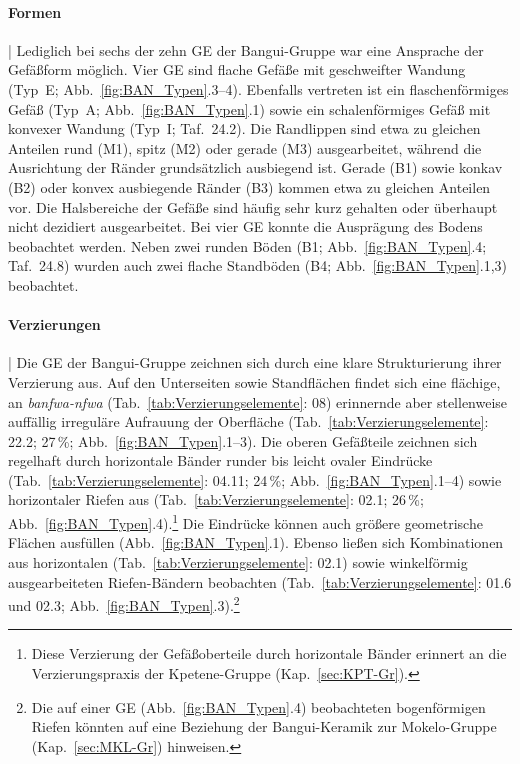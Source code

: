 \paragraph{Formen}\hspace{-.5em}|\hspace{.5em}%
Lediglich bei sechs der zehn GE der Bangui-Gruppe war eine Ansprache der Gefäßform möglich. Vier GE sind flache Gefäße mit geschweifter Wandung (Typ~E; Abb.~\ref{fig:BAN_Typen}.3--4). Ebenfalls vertreten ist ein flaschenförmiges Gefäß (Typ~A; Abb.~\ref{fig:BAN_Typen}.1) sowie ein schalenförmiges Gefäß mit konvexer Wandung (Typ~I; Taf.~24.2). Die Randlippen sind etwa zu gleichen Anteilen rund (M1), spitz (M2) oder gerade (M3) ausgearbeitet, während die Ausrichtung der Ränder grundsätzlich ausbiegend ist. Gerade (B1) sowie konkav (B2) oder konvex ausbiegende Ränder (B3) kommen etwa zu gleichen Anteilen vor. Die Halsbereiche der Gefäße sind häufig sehr kurz gehalten oder überhaupt nicht dezidiert ausgearbeitet. Bei vier GE konnte die Ausprägung des Bodens beobachtet werden. Neben zwei runden Böden (B1; Abb.~\ref{fig:BAN_Typen}.4; Taf.~24.8) wurden auch zwei flache Standböden (B4; Abb.~\ref{fig:BAN_Typen}.1,3) beobachtet.

\paragraph{Verzierungen}\hspace{-.5em}|\hspace{.5em}%
Die GE der Bangui-Gruppe zeichnen sich durch eine klare Strukturierung ihrer Verzierung aus. Auf den Unterseiten sowie Standflächen findet sich eine flächige, an \textit{banfwa-nfwa} (Tab.~\ref{tab:Verzierungselemente}: 08) erinnernde aber stellenweise auffällig irreguläre Aufrauung der Oberfläche (Tab.~\ref{tab:Verzierungselemente}: 22.2; 27\,\%; Abb.~\ref{fig:BAN_Typen}.1--3). Die oberen Gefäßteile zeichnen sich regelhaft durch horizontale Bänder runder bis leicht ovaler Eindrücke (Tab.~\ref{tab:Verzierungselemente}: 04.11; 24\,\%; Abb.~\ref{fig:BAN_Typen}.1--4) sowie horizontaler Riefen aus (Tab.~\ref{tab:Verzierungselemente}: 02.1; 26\,\%; Abb.~\ref{fig:BAN_Typen}.4).\footnote{Diese Verzierung der Gefäßoberteile durch horizontale Bänder erinnert an die Verzierungspraxis der Kpetene-Gruppe (Kap.~\ref{sec:KPT-Gr}).} Die Eindrücke können auch größere geometrische Flächen ausfüllen (Abb.~\ref{fig:BAN_Typen}.1). Ebenso ließen sich Kombinationen aus horizontalen (Tab.~\ref{tab:Verzierungselemente}: 02.1) sowie winkelförmig ausgearbeiteten Riefen-Bändern beobachten (Tab.~\ref{tab:Verzierungselemente}: 01.6 und 02.3; Abb.~\ref{fig:BAN_Typen}.3).\footnote{Die auf einer GE (Abb.~\ref{fig:BAN_Typen}.4) beobachteten bogenförmigen Riefen könnten auf eine Beziehung der Bangui-Keramik zur Mokelo-Gruppe (Kap.~\ref{sec:MKL-Gr}) hinweisen.}


